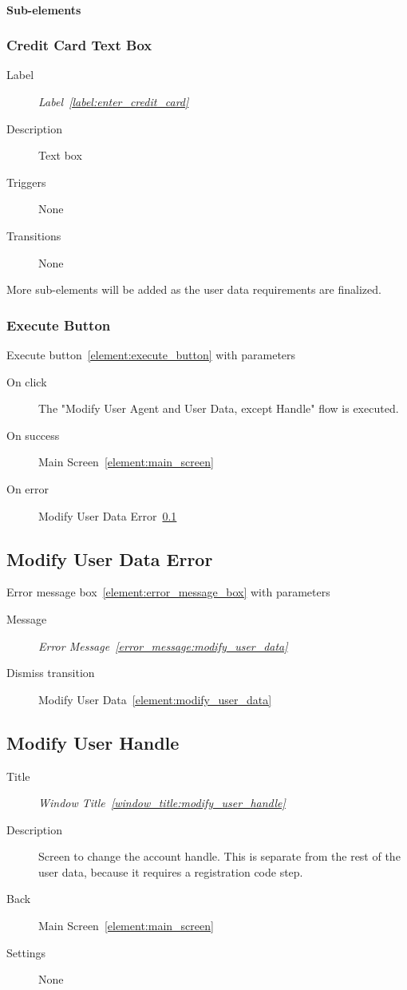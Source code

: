 \documentclass[a4paper,10pt]{article}
\newcommand{\windowTitleLabelText}{Window Title}
\newcommand{\windowTitleLabel}{window_title:}
\DeclareRobustCommand{\windowTitleRef}[1]{%
   \emph{\windowTitleLabelText~\ref{\windowTitleLabel#1}}}
\newcommand{\errorMessageLabelText}{Error Message}
\newcommand{\errorMessageLabel}{error_message:}
\DeclareRobustCommand{\errorMessageTextRef}[1]{%
   \emph{\errorMessageLabelText~\ref{\errorMessageLabel#1}}}
\newcommand{\labelLabelText}{Label}
\newcommand{\labelLabel}{label:}
\DeclareRobustCommand{\labelRef}[1]{%
   \emph{\labelLabelText~\ref{\labelLabel#1}}}
\newcommand{\elementLabel}{element:}
\DeclareRobustCommand{\element}[2]{\subsection{#1}\label{\elementLabel#2}}
\DeclareRobustCommand{\elementRef}[1]{\ref{\elementLabel#1}}
\begin{document}
\paragraph{Sub-elements}

\subsubsection{Credit Card Text Box}
\begin{description}
 \item[Label] \labelRef{enter_credit_card}
 \item[Description] Text box
 \item[Triggers] None
 \item[Transitions] None
\end{description}

More sub-elements will be added as the user data requirements are finalized.

\subsubsection{Execute Button}
Execute button~\elementRef{execute_button} with parameters
\begin{description}
 \item[On click] The "Modify User Agent and User Data, except Handle" flow is 
executed.
 \item[On success] Main Screen~\elementRef{main_screen}
 \item[On error] Modify User Data Error~\elementRef{modify_user_data_error}
\end{description}

\element{Modify User Data Error}{modify_user_data_error}

Error message box~\elementRef{error_message_box} with parameters
\begin{description}
 \item[Message] \errorMessageTextRef{modify_user_data}
 \item[Dismiss transition] Modify User Data~\elementRef{modify_user_data}
\end{description}

\element{Modify User Handle}{modify_user_handle}

\begin{description}
 \item[Title] \windowTitleRef{modify_user_handle}
 \item[Description] Screen to change the account handle. This is separate from 
the rest of the user data, because it requires a registration code step.
 \item[Back] Main Screen~\elementRef{main_screen}
 \item[Settings] None
\end{description}
\end{document}
